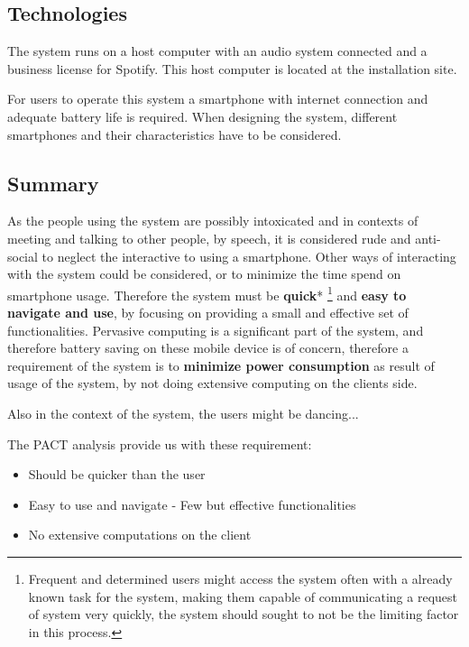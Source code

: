 \subsection{Technologies}
\label{sub:pact_technologies}

The system runs on a host computer with an audio system connected and a business license for Spotify.  This host computer is located at the installation site.

For users to operate this system a smartphone with internet connection and adequate battery life is required. 
When designing the system, different smartphones and their characteristics have to be considered.

\subsection{Summary}
\label{sec:pact_summary}

As the people using the system are possibly intoxicated and in contexts of meeting and talking to other people, by speech, it is considered rude and anti-social to neglect the interactive to using a smartphone. Other ways of interacting with the system could be considered, or to minimize the time spend on smartphone usage. Therefore the system must be \textbf{quick}* \footnote{Frequent and determined users might access the system often with a already known task for the system, making them capable of communicating a request of system very quickly, the system should sought to not be the limiting factor in this process.} and \textbf{easy to navigate and use}, by focusing on providing a small and effective set of functionalities. Pervasive computing is a significant part of the system, and therefore battery saving on these mobile device is of concern, therefore a requirement of the system is to \textbf{minimize power consumption} as result of usage of the system, by not doing extensive computing on the clients side.

Also in the context of the system, the users might be dancing... 

The PACT analysis provide us with these requirement:
\begin{itemize}
  \item Should be quicker than the user
  \item Easy to use and navigate - Few but effective functionalities
  \item No extensive computations on the client
\end{itemize}
